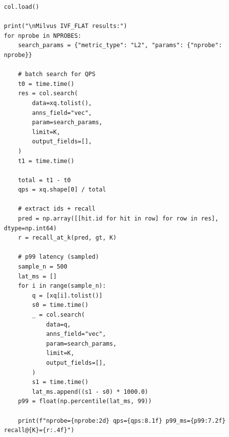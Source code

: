 \documentclass[11pt,a4paper]{article}
\begin{document}
\begin{verbatim}
col.load()

print("\nMilvus IVF_FLAT results:")
for nprobe in NPROBES:
    search_params = {"metric_type": "L2", "params": {"nprobe": nprobe}}

    # batch search for QPS
    t0 = time.time()
    res = col.search(
        data=xq.tolist(),
        anns_field="vec",
        param=search_params,
        limit=K,
        output_fields=[],
    )
    t1 = time.time()

    total = t1 - t0
    qps = xq.shape[0] / total

    # extract ids + recall
    pred = np.array([[hit.id for hit in row] for row in res], dtype=np.int64)
    r = recall_at_k(pred, gt, K)

    # p99 latency (sampled)
    sample_n = 500
    lat_ms = []
    for i in range(sample_n):
        q = [xq[i].tolist()]
        s0 = time.time()
        _ = col.search(
            data=q,
            anns_field="vec",
            param=search_params,
            limit=K,
            output_fields=[],
        )
        s1 = time.time()
        lat_ms.append((s1 - s0) * 1000.0)
    p99 = float(np.percentile(lat_ms, 99))

    print(f"nprobe={nprobe:2d} qps={qps:8.1f} p99_ms={p99:7.2f} recall@{K}={r:.4f}")
\end{verbatim}
\end{document}
